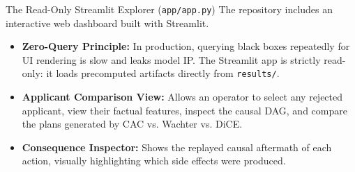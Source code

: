 \documentclass[11pt,a4paper]{article}
\begin{document}
\begin{center}
\end{center}

\begin{parentconcept}{The Read-Only Streamlit Explorer (\texttt{app/app.py})}
The repository includes an interactive web dashboard built with Streamlit.
\begin{itemize}[leftmargin=1.5em]
    \item \textbf{Zero-Query Principle:} In production, querying black boxes repeatedly for UI rendering is slow and leaks model IP. The Streamlit app is strictly read-only: it loads precomputed artifacts directly from \texttt{results/}.
    \item \textbf{Applicant Comparison View:} Allows an operator to select any rejected applicant, view their factual features, inspect the causal DAG, and compare the plans generated by CAC vs. Wachter vs. DiCE.
    \item \textbf{Consequence Inspector:} Shows the replayed causal aftermath of each action, visually highlighting which side effects were produced.
\end{itemize}
\end{parentconcept}
\end{document}
